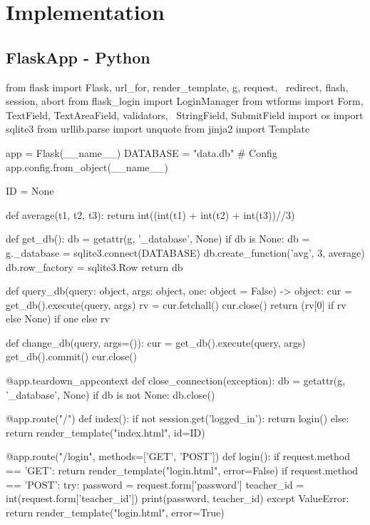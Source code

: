 \chapter{Implementation}

\section{FlaskApp - Python}

\begin{python}
from flask import Flask, url_for, render_template, g, request, \
    redirect, flash, session, abort
from flask_login import LoginManager
from wtforms import Form, TextField, TextAreaField, validators,  \
    StringField, SubmitField
import os
import sqlite3
from urllib.parse import unquote
from jinja2 import Template

app = Flask(__name__)
DATABASE = "data.db"
# Config
app.config.from_object(__name__)

ID = None

def average(t1, t2, t3):
    return int((int(t1) + int(t2) + int(t3))//3)

def get_db():
    db = getattr(g, '_database', None)
    if db is None:
        db = g._database = sqlite3.connect(DATABASE)
        db.create_function('avg', 3, average)
        db.row_factory = sqlite3.Row
    return db


def query_db(query: object, args: object, one: object = False) -> object:
    cur = get_db().execute(query, args)
    rv = cur.fetchall()
    cur.close()
    return (rv[0] if rv else None) if one else rv


def change_db(query, args=()):
    cur = get_db().execute(query, args)
    get_db().commit()
    cur.close()

@app.teardown_appcontext
def close_connection(exception):
    db = getattr(g, '_database', None)
    if db is not None:
        db.close()


@app.route("/")
def index():
    if not session.get('logged_in'):
        return login()
    else:
        return render_template("index.html", id=ID)


@app.route("/login", methods=['GET', 'POST'])
def login():
    if request.method == 'GET':
        return render_template("login.html", error=False)
    if request.method == 'POST':
        try:
            password = request.form['password']
            teacher_id = int(request.form['teacher_id'])
            print(password, teacher_id)
        except ValueError:
            return render_template("login.html", error=True)


\end{python}
